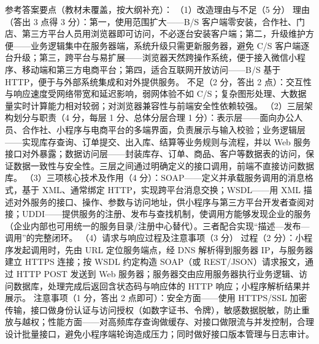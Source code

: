 \documentclass[a4paper,11pt]{article}
\begin{document}

\q 参考答案要点（教材未覆盖，按大纲补充）：
（1）改造理由与不足（5 分）
理由（答出 3 点得 3 分）：第一，使用范围扩大——B/S 客户端零安装，合作社、门店、第三方平台人员用浏览器即可访问，不必逐台安装客户端；第二，升级维护方便——业务逻辑集中在服务器端，系统升级只需更新服务器，避免 C/S 客户端逐台升级；第三，跨平台与易扩展——浏览器天然跨操作系统，便于接入微信小程序、移动端和第三方电商平台；第四，适合互联网开放访问——B/S 基于 HTTP，便于与外部系统集成和对外提供服务。
不足（2 分，答出 2 点）：交互性与响应速度受网络带宽和延迟影响，弱网体验不如 C/S；复杂图形处理、大数据量实时计算能力相对较弱；对浏览器兼容性与前端安全性依赖较强。
（2）三层架构划分与职责（4 分，每层 1 分、总体分层合理 1 分）：表示层——面向办公人员、合作社、小程序与电商平台的多端界面，负责展示与输入校验；业务逻辑层——实现库存查询、订单提交、出入库、结算等业务规则与流程，并以 Web 服务接口对外暴露；数据访问层——封装库存、订单、商品、客户等数据表的访问，保证数据一致性与安全性。三层之间通过明确定义的接口调用，前端不直接访问数据库。
（3）三项核心技术及作用（4 分）：SOAP——定义并承载服务调用的消息格式，基于 XML、通常绑定 HTTP，实现跨平台消息交换；WSDL——用 XML 描述对外服务的接口、操作、参数与访问地址，供小程序与第三方平台开发者查阅对接；UDDI——提供服务的注册、发布与查找机制，使调用方能够发现企业的服务（企业内部也可用统一的服务目录/注册中心替代）。三者配合实现“描述—发布—调用”的完整闭环。
（4）请求与响应过程及注意事项（3 分）
过程（2 分）：小程序发起调用时，先由 URL 定位服务端点，经 DNS 解析得到服务器 IP，与服务器建立 HTTPS 连接；按 WSDL 约定构造 SOAP（或 REST/JSON）请求报文，通过 HTTP POST 发送到 Web 服务器；服务器交由应用服务器执行业务逻辑、访问数据库，处理完成后返回含状态码与响应体的 HTTP 响应；小程序解析结果并展示。
注意事项（1 分，答出 2 点即可）：安全方面——使用 HTTPS/SSL 加密传输，接口做身份认证与访问授权（如数字证书、令牌），敏感数据脱敏，防止重放与越权；性能方面——对高频库存查询做缓存、对接口做限流与并发控制，合理设计批量接口，避免小程序端轮询造成压力；同时做好接口版本管理与日志审计。
\end{document}
